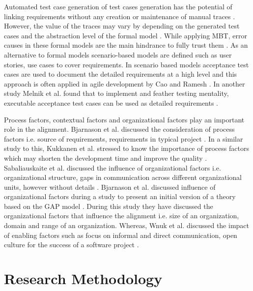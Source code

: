 \documentclass{article}
\begin{document}
Automated test case generation of test cases generation has the potential of linking requirements without any creation or maintenance  of manual traces  \cite{bjarnason2014challengesS9}. However, the value of the traces may vary by depending on the generated test cases and the abstraction level of the formal model  \cite{sabaliauskaite2010challengesS3}. While applying MBT, error causes in these formal models are the main hindrance to fully trust them \cite{hasling2008model,ferguson2006empirical}. As an alternative to formal models scenario-based models are defined such as user stories, use cases \cite{regnell2000towards,regnell1998combining}  to cover requirements. In scenario based models acceptance test cases are used to document the detailed requirements at a high level and this approach is often applied in agile development by Cao and Ramesh \cite{cao2008agile}. In  another study Melnik et al. found that to implement and feather testing mentality, executable acceptance test cases can be used as detailed requirements \cite{melnik2006executable}.

Process factors, contextual factors and organizational factors play an important role in the alignment. Bjarnason et al. discussed the consideration of process factors i.e. source of requirements, requirements in typical project \cite{bjarnason2015industrialS14}. In a similar study to this, Kukkanen et al. stressed to know the importance of process factors which may shorten the development time and improve the quality \cite{kukkanen2009applyingS2}. Sabaliauskaite et al.  discussed the influence of organizational factors i.e. organizational structure, gaps in communication across different organizational units, however without details \cite{sabaliauskaite2010challengesS3}.  Bjarnason et al. discussed influence of organizational factors during a study to present an initial version of a theory based on the GAP model \cite{bjarnason2013distances}. During this study they have discussed the organizational factors that influence the alignment i.e. size of an organization, domain and range of an organization. Whereas, Wnuk et al.  discussed the impact of enabling factors such as focus on informal and direct communication, open culture for the success of a software project \cite{wnuk2014delicateS8}.

\section{Research Methodology}\label{RM}
\end{document}
